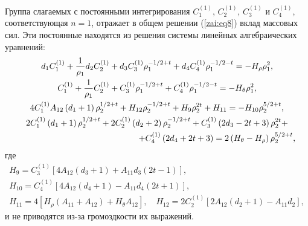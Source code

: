 Группа слагаемых с постоянными интегрирования $C^{( 1)}_{1} $, $C^{(1)}_{2} $, $C^{(1)}_{3} $ и $C^{( 1 )}_{4} $, соответствующая $n =
1$, отражает в общем решении (\ref{zai:eq8}) вклад массовых сил. 
Эти постоянные находятся из решения системы линейных алгебраических уравнений:
\begin{gather*}
d_1 C^{(1)}_1 + \frac{1}{\rho_1} d_2 C^{\left( 1
\right)}_2 + d_3 C^{(1)}_3 \rho _1^{ - 1
\mathord{\left/ {\vphantom {1 2}} \right. \kern-\nulldelimiterspace}
2 + t} + d_4 C^{(1)}_4 \rho _1^{ - 1 \mathord{\left/
{\vphantom {1 2}} \right. \kern-\nulldelimiterspace} 2 - t} = -
H_\rho \rho _1^2 ,
\\
C^{(1)}_1 + \frac{1}{\rho_1} C^{(1)}_2 +
C^{(1)}_3 \rho _1^{ - 1 \mathord{\left/ {\vphantom {1
2}} \right. \kern-\nulldelimiterspace} 2 + t} + C^{\left( 1
\right)}_4 \rho _1^{ - 1 \mathord{\left/ {\vphantom {1 2}} \right.
\kern-\nulldelimiterspace} 2 - t} = - H_\theta \rho _1^2 ,
\\
4C^{(1)}_1 A_{12} \left( {d_1 + 1} \right)\rho _2^{1
\mathord{\left/ {\vphantom {1 2}} \right. \kern-\nulldelimiterspace}
2 + t} + H_{12} \rho_2^{{ - 1} \mathord{\left/ {\vphantom {{ - 1}
2}} \right. \kern-\nulldelimiterspace} 2 + t} + H_9 \rho _2^{2t} +
H_{11} = - H_{10} \rho _2^{5 \mathord{\left/ {\vphantom {5 2}}
\right. \kern-\nulldelimiterspace} 2 + t} ,
\\
 2C^{\left( 1
\right)}_1 \left( {d_1 + 1} \right)\rho _2^{1 \mathord{\left/
{\vphantom {1 2}} \right. \kern-\nulldelimiterspace} 2 + t} +
2C^{(1)}_2 \left( {d_2 + 2} \right)\rho _2^{{ - 1}
\mathord{\left/ {\vphantom {{ - 1} 2}} \right.
\kern-\nulldelimiterspace} 2 + t} + C^{(1)}_3 \left(
{2d_3 - 2t + 3} \right)\rho
_2^{2t} + \\
\hspace{5cm} + C^{\left( 1
\right)}_4 \left( {2d_4 + 2t + 3} \right) = 2\left( {H_\theta -
H_\rho } \right)\rho _2^{5 \mathord{\left/ {\vphantom {5 2}} \right.
\kern-\nulldelimiterspace} 2 + t} ,
\end{gather*}
\noindent где
\begin{gather*}
H_9 = C_3^{(1)} \left[ {4A_{12} \left( {d_3 + 1}
\right) + A_{11} d_3 \left( {2t - 1} \right)} \right],
\\
H_{10} = C_4^{(1)} \left[ {4A_{12} \left( {d_4 + 1}
\right) - A_{11} d_4 \left( {2t + 1} \right)} \right],
\\
H_{11} = 4\left[ {H_\rho \left( {A_{11} + A_{12} } \right) +
H_\theta A_{12} } \right], \quad H_{12} = 2C_2^{(1)}
\left[ {2A_{12} \left( {d_2 + 1} \right) - A_{11} d_2 } \right],
\end{gather*}
\noindent и не приводятся из-за громоздкости их выражений.

